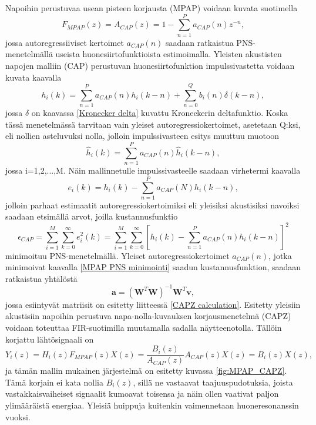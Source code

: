 \documentclass[finnish,12pt]{article}
\begin{document}
Napoihin perustuvaa usean pisteen korjausta (MPAP) voidaan kuvata suotimella \begin{equation}
F_{MPAP}(z) = A_{CAP}(z) = 1 - \sum\limits_{n=1}^P a_{CAP}(n) z^{-n},
\end{equation} jossa autoregressiiviset kertoimet $a_{CAP}(n)$ saadaan ratkaistua PNS-menetelmällä useista huonesiirtofunktioista estimoimalla. Yleisten akustisten napojen malliin (CAP) perustuvan huonesiirtofunktion impulssivastetta voidaan kuvata kaavalla \begin{equation}
h_i(k) = \sum\limits_{n=1}^P a_{CAP}(n) h_i(k - n) + \sum\limits_{n=0}^Q b_i(n) \delta(k - n),
\end{equation} jossa $\delta$ on kaavassa \eqref{Kronecker delta} kuvattu Kroneckerin deltafunktio. Koska tässä menetelmässä tarvitaan vain yleiset autoregressiokertoimet, asetetaan Q:ksi, eli nollien asteluvuksi nolla, jolloin impulssivasteen esitys muuttuu muotoon \begin{equation}
\hat{h}_i(k) = \sum\limits_{n=1}^P a_{CAP}(n) \hat{h}_i(k-n),
\end{equation} jossa i=1,2,...,M. Näin mallinnetulle impulssivasteelle saadaan virhetermi kaavalla \begin{equation}
e_i(k) = h_i(k) - \sum\limits_{n=1}^P a_{CAP}(N) h_i(k-n),
\end{equation} jolloin parhaat estimaatit autoregressiokertoimiksi eli yleisiksi akustisiksi navoiksi saadaan etsimällä arvot, joilla kustannusfunktio \begin{equation} \label{MPAP PNS minimointi}
\epsilon_{CAP} = \sum\limits_{i=1}^M \sum\limits_{k=0}^\infty e_i^2(k) = \sum\limits_{i=1}^M \sum\limits_{k=0}^\infty \left[ h_i(k) - \sum\limits_{n=1}^P a_{CAP}(n) h_i(k - n) \right]^2
\end{equation} minimoituu PNS-menetelmällä. Yleiset autoregressiokertoimet $a_{CAP}(n)$, jotka minimoivat kaavalla \eqref{MPAP PNS minimointi} saadun kustannusfunktion, saadaan ratkaistua yhtälöstä \begin{equation} \label{MPAP PNS minimointi matrix}
\textbf{a} = (\textbf{W}^T \textbf{W})^{-1} \textbf{W}^T \textbf{v},
\end{equation} jossa esiintyvät matriisit on esitetty liitteessä \ref{CAPZ calculation}. Esitetty yleisiin akustisiin napoihin perustuva napa-nolla-kuvauksen korjausmenetelmä (CAPZ) voidaan toteuttaa FIR-suotimilla muutamalla sadalla näytteenotolla. Tällöin korjattu lähtösignaali on \begin{equation}
Y_i(z) = H_i(z) F_{MPAP}(z) X(z) = \frac{B_i(z)}{A_{CAP}(z)} A_{CAP}(z) X(z) = B_i(z) X(z),
\label{MPAP CAPZ}
\end{equation} ja tämän mallin mukainen järjestelmä on esitetty kuvassa \ref{fig:MPAP_CAPZ}. Tämä korjain ei kata nollia $B_i(z)$, sillä ne vastaavat taajuuspudotuksia, joista vastakkaisvaiheiset signaalit kumoavat toisensa ja näin ollen vaativat paljon ylimääräistä energiaa. Yleisiä huippuja kuitenkin vaimennetaan huoneresonanssin vuoksi. \cite{YHaneda1997} 
\end{document}
